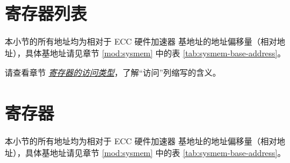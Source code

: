 \documentclass[main\_\_CN.tex]{subfiles}
\begin{document}
\clearpage
\hypertarget{ecc-reg-summ}{}
\section{寄存器列表}
\label{sec:ecc-reg-summ}

本小节的所有地址均为相对于  ECC 硬件加速器 基地址的地址偏移量（相对地址），具体基地址请见章节 \ref{mod:sysmem} \textit{} 中的表 \ref{tab:sysmem-base-address}。

请查看章节 \hyperref[glossary-access-types]{\textit{寄存器的访问类型}}，了解“访问”列缩写的含义。






\clearpage
\section{寄存器}

本小节的所有地址均为相对于 ECC 硬件加速器 基地址的地址偏移量（相对地址），具体基地址请见章节 \ref{mod:sysmem} \textit{} 中的表 \ref{tab:sysmem-base-address}。


\end{document}
